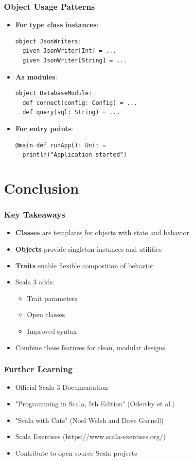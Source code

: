 \documentclass{beamer}
\begin{document}
\begin{frame}[fragile]
\frametitle{Object Usage Patterns}
\begin{itemize}
\item \textbf{For type class instances}:
\begin{lstlisting}[style=scala]
object JsonWriters:
  given JsonWriter[Int] = ...
  given JsonWriter[String] = ...
\end{lstlisting}

\item \textbf{As modules}:
\begin{lstlisting}[style=scala]
object DatabaseModule:
  def connect(config: Config) = ...
  def query(sql: String) = ...
\end{lstlisting}

\item \textbf{For entry points}:
\begin{lstlisting}[style=scala]
@main def runApp(): Unit =
  println("Application started")
\end{lstlisting}
\end{itemize}
\end{frame}

\section{Conclusion}
\begin{frame}
\frametitle{Key Takeaways}
\begin{itemize}
\item \textbf{Classes} are templates for objects with state and behavior
\item \textbf{Objects} provide singleton instances and utilities
\item \textbf{Traits} enable flexible composition of behavior
\item Scala 3 adds:
\begin{itemize}
\item Trait parameters
\item Open classes
\item Improved syntax
\end{itemize}
\item Combine these features for clean, modular designs
\end{itemize}
\end{frame}

\begin{frame}
\frametitle{Further Learning}
\begin{itemize}
\item Official Scala 3 Documentation
\item "Programming in Scala, 5th Edition" (Odersky et al.)
\item "Scala with Cats" (Noel Welsh and Dave Gurnell)
\item Scala Exercises (https://www.scala-exercises.org/)
\item Contribute to open-source Scala projects
\end{itemize}
\end{frame}
\end{document}
